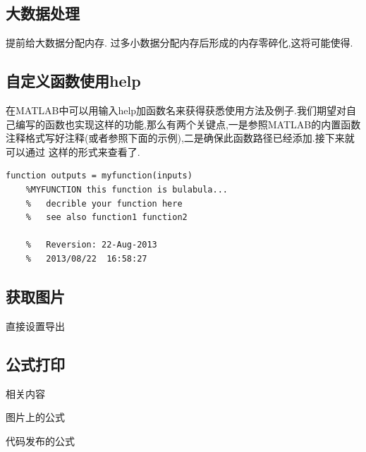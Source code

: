 \subsection{大数据处理}
 提前给大数据分配内存. 过多小数据分配内存后形成的内存零碎化,这将可能使得.



\subsection{自定义函数使用help}
在MATLAB中可以用输入help加函数名来获得获悉使用方法及例子.我们期望对自己编写的函数也实现这样的功能,那么有两个关键点,一是参照MATLAB的内置函数注释格式写好注释(或者参照下面的示例),二是确保此函数路径已经添加.接下来就可以通过  这样的形式来查看了.

\vspace{-0.8cm}
\begin{lstlisting}[caption = 自定义帮助]
	function outputs = myfunction(inputs)
	%MYFUNCTION this function is bulabula...
	%   decrible your function here
	%   see also function1 function2

	%   Reversion: 22-Aug-2013
	%   2013/08/22  16:58:27
\end{lstlisting}



\subsection{获取图片}
\begin{itemize*}
	\item {}
	\item 直接设置导出
\end{itemize*}



\subsection{公式打印}
相关内容
\begin{itemize*}
	\item 图片上的公式
	\item 代码发布的公式
\end{itemize*}